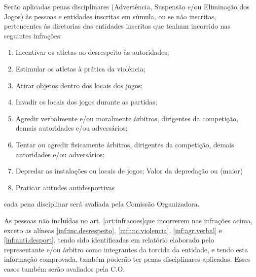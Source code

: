 \begin{article}
	\label{art:infracoes}
	Serão aplicadas penas disciplinares (Advertência, Suspensão e/ou Eliminação dos Jogos) às pessoas e entidades inscritas em súmula, ou se não inscritas, pertencentes às diretorias das entidades inscritas que tenham incorrido nas seguintes infrações:

	\begin{enumerate}[noitemsep]
		\item \label{inf:inc.desrespeito}
			Incentivar os atletas ao desrespeito às autoridades; 
		\item \label{inf:inc.violencia}
			Estimular os atletas à prática da violência; 
		\item Atirar objetos dentro dos locais dos jogos; 
		\item Invadir os locais dos jogos durante as partidas; 
		\item \label{inf:agr.verbal}
			Agredir verbalmente e/ou moralmente árbitros, dirigentes da competição, demais autoridades e/ou adversários; 
		\item Tentar ou agredir fisicamente árbitros, dirigentes da competição, demais autoridades e/ou adversários; 
		\item Depredar as instalações ou locais de jogos; Valor da depredação ou  (maior)
		\item \label{inf:anti.desport}
			Praticar atitudes antidesportivas 
	\end{enumerate}

	\begin{xparagraph}
		cada pena disciplinar será avaliada pela Comissão Organizadora.
	\end{xparagraph}
\end{article}

\begin{article}
	As pessoas não incluídas no art. \ref{art:infracoes}\ulo que incorrerem nas infrações acima, exceto as alíneas \ref{inf:inc.desrespeito}, \ref{inf:inc.violencia}, \ref{inf:agr.verbal} e \ref{inf:anti.desport}, tendo sido identificadas em relatório elaborado pelo representante e/ou árbitro como integrantes da torcida da entidade, e tendo esta informação comprovada, também poderão ter penas disciplinares aplicadas. Esses casos também serão avaliados pela C.O.
\end{article}

